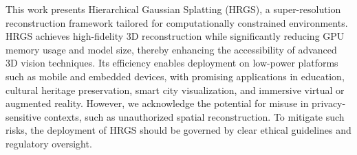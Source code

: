This work presents Hierarchical Gaussian Splatting (HRGS), a super-resolution reconstruction framework tailored for computationally constrained environments. HRGS achieves high-fidelity 3D reconstruction while significantly reducing GPU memory usage and model size, thereby enhancing the accessibility of advanced 3D vision techniques. Its efficiency enables deployment on low-power platforms such as mobile and embedded devices, with promising applications in education, cultural heritage preservation, smart city visualization, and immersive virtual or augmented reality.
However, we acknowledge the potential for misuse in privacy-sensitive contexts, such as unauthorized spatial reconstruction. To mitigate such risks, the deployment of HRGS should be governed by clear ethical guidelines and regulatory oversight.

